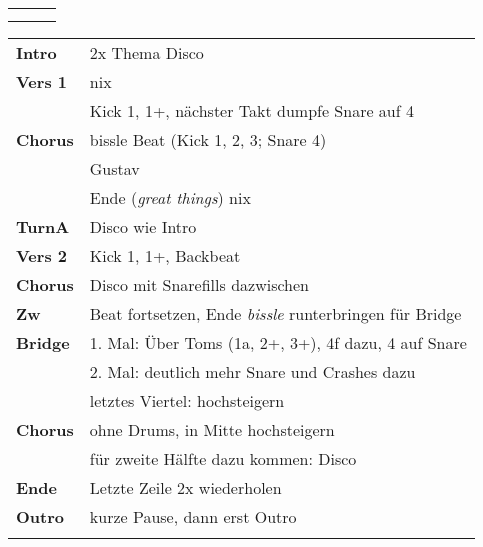 

\begin{tabular}{p{0.6cm}p{12cm}p{1.4cm}}
	\rowcolor{cyan} \myRow{\thesongnumber} & \myRow{Great Things} & \myRow{102} \\
	                                       &                      &             \\
\end{tabular}

\begin{tabular}{p{1.6cm}l}
	\textbf{Intro}  & 2x Thema Disco                                                 \\
	\textbf{Vers 1} & nix                                                            \\
	                & Kick 1, 1+, nächster Takt dumpfe Snare auf 4                   \\
	\textbf{Chorus} & bissle Beat (Kick 1, 2, 3; Snare 4)                            \\
	                & Gustav                                                         \\
	                & Ende (\textit{great things}) nix                               \\
	\textbf{TurnA}  & Disco wie Intro                                                \\
	\textbf{Vers 2} & Kick 1, 1+, Backbeat                                           \\
	\textbf{Chorus} & Disco mit Snarefills dazwischen                                \\
	\textbf{Zw}     & Beat fortsetzen, Ende \textit{bissle} runterbringen für Bridge \\
	\textbf{Bridge} & 1. Mal: Über Toms (1a, 2+, 3+), 4f dazu, 4 auf Snare           \\
	                & 2. Mal: deutlich mehr Snare und Crashes dazu                   \\
	                & letztes Viertel: \viertel hochsteigern                         \\
	\textbf{Chorus} & ohne Drums, in Mitte hochsteigern                              \\
	                & für zweite Hälfte dazu kommen: Disco                           \\
	\textbf{Ende}   & Letzte Zeile 2x wiederholen                                    \\
	\textbf{Outro}  & kurze Pause, dann erst Outro                                   \\
	                &                                                                \\
\end{tabular}
